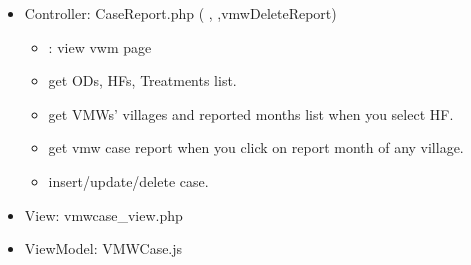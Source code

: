 \documentclass[letterpaper,10pt,english,openany,oneside]{sphinxmanual}
\begin{document}
\begin{itemize}
\item {} 
\sphinxAtStartPar
Controller: CaseReport.php (  , ,vmwDeleteReport)
\begin{itemize}
\item {} 
\sphinxAtStartPar
{} : view vwm page

\item {} 
\sphinxAtStartPar
{} get ODs, HFs, Treatments list.

\item {} 
\sphinxAtStartPar
{} get VMWs’ villages and reported months list when you select HF.

\item {} 
\sphinxAtStartPar
{} get vmw case report when you click on report month of any village.

\item {} 
\sphinxAtStartPar
{} insert/update/delete case.

\end{itemize}

\begin{sphinxVerbatim}[commandchars=\\\{\}]
  
   
      
   
 
\end{sphinxVerbatim}

\item {} 
\sphinxAtStartPar
View: vmwcase\_view.php

\item {} 
\sphinxAtStartPar
ViewModel: VMWCase.js

\end{itemize}

\begin{sphinxVerbatim}[commandchars=\\\{\}]
  
  
    
    
  
  
     
     
\end{sphinxVerbatim}
\end{document}
